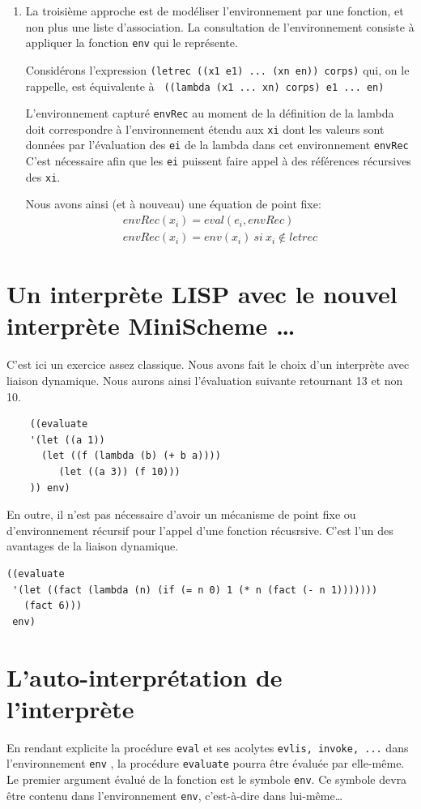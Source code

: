 \documentclass[11pt]{book}
\begin{document}
\begin{enumerate}
\begin{Verbatim}
 (define fact (Y F*))
\end{Verbatim}
  
  \item La troisième approche est de modéliser l'environnement par une fonction, et non plus une liste d'association.
  La consultation de l'environnement consiste \`{a} appliquer la fonction \verb+env+ qui le repr\'{e}sente.

  Considérons l'expression \verb+(letrec ((x1 e1) ... (xn en)) corps)+  qui, on le rappelle, est \'{e}quivalente à 
  \verb+ ((lambda (x1 ... xn) corps) e1 ... en)+
  
  L'environnement capturé \verb+envRec+ au moment de la définition de la lambda  doit correspondre à 
  l'environnement étendu aux \verb+xi+ dont les valeurs sont données par l'évaluation des \verb+ei+ de la lambda 
  dans cet environnement \verb+envRec+
  C'est nécessaire afin que les \verb+ei+ puissent faire appel à des références récursives des \verb+xi+.
  
  Nous avons ainsi (et à nouveau) une équation de point fixe:
\[
  \begin{array}{l}
    envRec(x_i) = eval (e_i, envRec) \\
    envRec(x_i) = env (x_i) \ si \ x_i \notin letrec
  \end{array}
\]
  
\end{enumerate}

\section{Un interprète LISP avec le nouvel interprète MiniScheme \ldots}
C'est ici un exercice assez classique.
Nous avons fait le choix d'un interprète avec liaison dynamique.
Nous aurons ainsi l'évaluation suivante retournant 13 et non 10.
\begin{Verbatim}
	((evaluate  
	'(let ((a 1))
	  (let ((f (lambda (b) (+ b a)))) 
		 (let ((a 3)) (f 10)))
	)) env)
\end{Verbatim}
En outre, il n'est pas nécessaire d'avoir un mécanisme de point fixe ou d'environnement récursif pour
l'appel d'une fonction récusrsive. C'est l'un des avantages de la liaison dynamique.
\begin{Verbatim}
((evaluate
 '(let ((fact (lambda (n) (if (= n 0) 1 (* n (fact (- n 1)))))))
   (fact 6)))
 env)
\end{Verbatim}


\section{L'auto-interprétation de l'interprète}
En rendant explicite la procédure \verb+eval+ et ses acolytes \verb+evlis, invoke, ...+ dans l'environnement
\verb+env+ , la procédure \verb+evaluate+ pourra être évaluée par elle-même. Le premier argument évalué de la fonction
est le symbole \verb+env+. Ce symbole devra être contenu dans l'environnement \verb+env+, c'est-à-dire dans lui-même\dots
\end{document}
